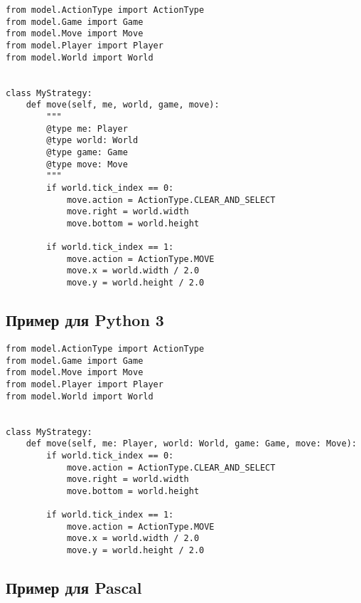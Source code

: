 \begin{verbatim}
from model.ActionType import ActionType
from model.Game import Game
from model.Move import Move
from model.Player import Player
from model.World import World


class MyStrategy:
    def move(self, me, world, game, move):
        """
        @type me: Player
        @type world: World
        @type game: Game
        @type move: Move
        """
        if world.tick_index == 0:
            move.action = ActionType.CLEAR_AND_SELECT
            move.right = world.width
            move.bottom = world.height

        if world.tick_index == 1:
            move.action = ActionType.MOVE
            move.x = world.width / 2.0
            move.y = world.height / 2.0
\end{verbatim}

\subsection{Пример для Python 3}

\begin{verbatim}
from model.ActionType import ActionType
from model.Game import Game
from model.Move import Move
from model.Player import Player
from model.World import World


class MyStrategy:
    def move(self, me: Player, world: World, game: Game, move: Move):
        if world.tick_index == 0:
            move.action = ActionType.CLEAR_AND_SELECT
            move.right = world.width
            move.bottom = world.height

        if world.tick_index == 1:
            move.action = ActionType.MOVE
            move.x = world.width / 2.0
            move.y = world.height / 2.0
\end{verbatim}

\newpage
\subsection{Пример для Pascal}

